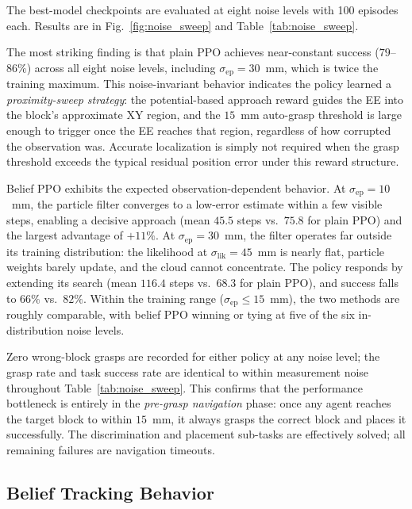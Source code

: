 \documentclass[conference]{IEEEtran}
\newcommand{\sigmaep}{\sigma_{\text{ep}}}
\begin{document}
The best-model checkpoints are evaluated at eight noise levels with
100 episodes each.
Results are in Fig.~\ref{fig:noise_sweep} and Table~\ref{tab:noise_sweep}.

The most striking finding is that plain PPO achieves near-constant success
($79$--$86\%$) across all eight noise levels, including $\sigmaep=30$~mm,
which is twice the training maximum.
This noise-invariant behavior indicates the policy learned a
\emph{proximity-sweep strategy}: the potential-based approach reward guides
the EE into the block's approximate XY region, and the $15$~mm auto-grasp
threshold is large enough to trigger once the EE reaches that region,
regardless of how corrupted the observation was.
Accurate localization is simply not required when the grasp threshold
exceeds the typical residual position error under this reward structure.

Belief PPO exhibits the expected observation-dependent behavior.
At $\sigmaep=10$~mm, the particle filter converges to a low-error estimate
within a few visible steps, enabling a decisive approach (mean $45.5$ steps
vs.\ $75.8$ for plain PPO) and the largest advantage of $+11\%$.
At $\sigmaep=30$~mm, the filter operates far outside its training
distribution: the likelihood at $\sigma_{\text{lik}}=45$~mm is nearly
flat, particle weights barely update, and the cloud cannot concentrate.
The policy responds by extending its search (mean $116.4$ steps vs.\
$68.3$ for plain PPO), and success falls to $66\%$ vs.\ $82\%$.
Within the training range ($\sigmaep\le15$~mm), the two methods are
roughly comparable, with belief PPO winning or tying at five of the six
in-distribution noise levels.

Zero wrong-block grasps are recorded for either policy at any noise level;
the grasp rate and task success rate are identical to within measurement
noise throughout Table~\ref{tab:noise_sweep}.
This confirms that the performance bottleneck is entirely in the
\emph{pre-grasp navigation} phase: once any agent reaches the target block
to within $15$~mm, it always grasps the correct block and places it
successfully.
The discrimination and placement sub-tasks are effectively solved; all
remaining failures are navigation timeouts.

\subsection{Belief Tracking Behavior}
\end{document}
